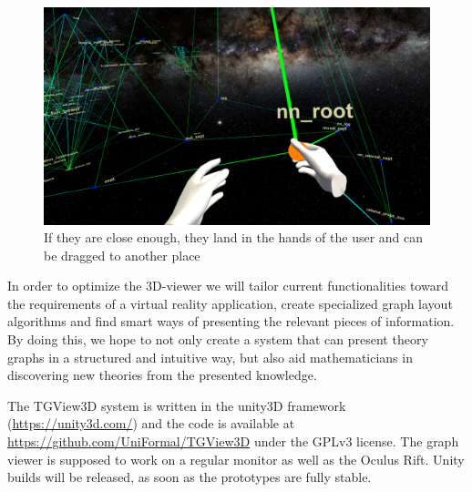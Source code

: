 \documentclass{llncs}
\begin{document}
\begin{figure}
    \centering
    \includegraphics[width=1\textwidth ]{grab}
    \caption{If they are close enough, they land in the hands of the user and can be dragged to another place}
    \label{fig:sample_figure}
\end{figure}

In order to optimize the 3D-viewer we will tailor current functionalities toward the
requirements of a virtual reality application, create specialized graph layout algorithms
and find smart ways of presenting the relevant pieces of information. By doing this, we
hope to not only create a system that can present theory graphs in a structured and
intuitive way, but also aid mathematicians in discovering new theories from the presented
knowledge.

The TGView3D system is written in the unity3D framework (\url{https://unity3d.com/}) and the code is available at \url{https://github.com/UniFormal/TGView3D} under the GPLv3 license.
The graph viewer is supposed to work on a regular monitor as well as the Oculus Rift. Unity builds will be released, as soon as the prototypes are fully stable.

\printbibliography
\end{document}
